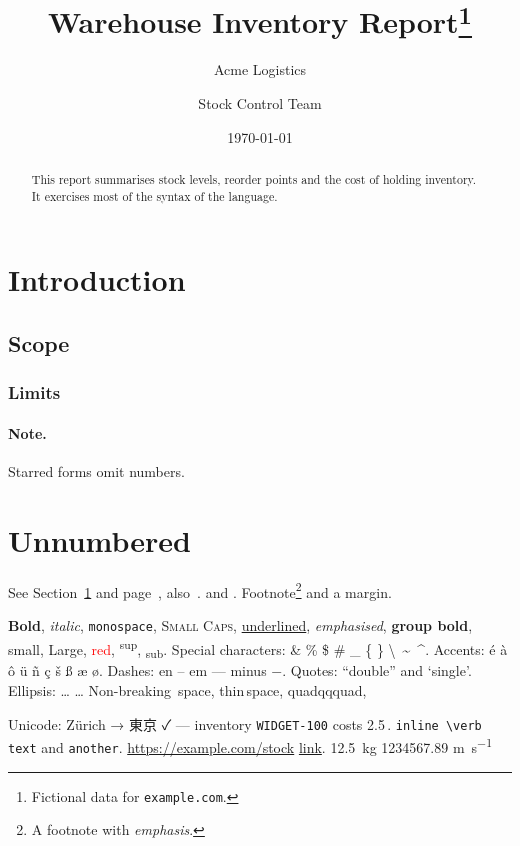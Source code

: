 \documentclass[11pt,a4paper,twoside]{article}
\title{Warehouse Inventory Report\thanks{Fictional data for \texttt{example.com}.}}
\author{Acme Logistics \and Stock Control Team}
\date{\today}
\newcommand{\sku}[1]{\texttt{#1}}
\newcommand{\qty}[2][units]{#2\,\mathrm{#1}}
\theoremstyle{definition}
\begin{document}
\maketitle
\tableofcontents
\listoffigures

\begin{abstract}
This report summarises stock levels, reorder points and the cost of holding inventory.
It exercises most of the syntax of the language.
\end{abstract}

\section{Introduction}\label{sec:intro}
\subsection{Scope}
\subsubsection{Limits}
\paragraph{Note.} Starred forms omit numbers.
\section*{Unnumbered}
See Section~\ref{sec:intro} and page~\pageref{sec:intro}, also~\cite{knuth1984,lamport1994}.
\textcite{knuth1984} and \autocite{lamport1994}.
Footnote\footnote{A footnote with \emph{emphasis}.} and a margin.

\textbf{Bold}, \textit{italic}, \texttt{monospace}, \textsc{Small Caps}, \underline{underlined},
\emph{emphasised}, {\bfseries group bold}, {\small small}, {\Large Large}, \textcolor{red}{red},
\textsuperscript{sup}, \textsubscript{sub}. Special characters: \& \% \$ \# \_ \{ \} \textbackslash\
\textasciitilde\ \textasciicircum. Accents: \'e \`a \^o \"u \~n \c{c} \v{s} \ss{} \ae{} \o{}.
Dashes: en -- em --- minus $-$. Quotes: ``double'' and `single'. Ellipsis: \ldots{} \dots
Non-breaking~space, thin\,space, \quad quad\qquad qqquad, \hspace{1cm} \vspace{2mm} \\[3pt]
\newline \linebreak \pagebreak \newpage \noindent \centering \raggedright \par
Unicode: Zürich → 東京 ✓ — inventory \sku{WIDGET-100} costs \qty[kg]{2.5}.
\verb|inline \verb text| and \verb+another+. \url{https://example.com/stock} \href{https://example.com}{link}.
\SI{12.5}{\kilogram} \num{1234567.89} \si{\metre\per\second}
\end{document}

